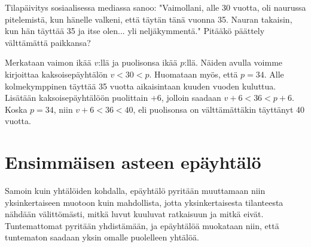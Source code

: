 \begin{tehtavasivu}
\begin{tehtava}
\star Tilapäivitys sosiaalisessa mediassa sanoo: "Vaimollani, alle 30 vuotta, oli naurussa pitelemistä, kun hänelle valkeni, että täytän tänä vuonna 35. Nauran takaisin, kun hän täyttää 35 ja itse olen... yli neljäkymmentä." Pitääkö päättely välttämättä paikkansa?
		\begin{vastaus}
		Merkataan vaimon ikää $v$:llä ja puolisonsa ikää $p$:llä. Näiden avulla voimme kirjoittaa kaksoisepäyhtälön $v<30<p$. Huomataan myös, että $p=34$. Alle kolmekymppinen täyttää 35 vuotta aikaisintaan kuuden vuoden kuluttua. Lisätään kaksoisepäyhtälöön puolittain $+6$, jolloin saadaan $v+6<36<p+6$. Koska $p=34$, niin $v+6<36<40$, eli puolisonsa on välttämättäkin täyttänyt 40 vuotta.
		\end{vastaus}
\end{tehtava}

\end{tehtavasivu}

\newpage

\section{Ensimmäisen asteen epäyhtälö}



Samoin kuin yhtälöiden kohdalla, epäyhtälö pyritään muuttamaan niin yksinkertaiseen muotoon kuin mahdollista, jotta yksinkertaisesta tilanteesta nähdään välittömästi, mitkä luvut kuuluvat ratkaisuun ja mitkä eivät. Tuntemattomat pyritään yhdistämään, ja epäyhtälöä muokataan niin, että tuntematon saadaan yksin omalle puolelleen yhtälöä.

